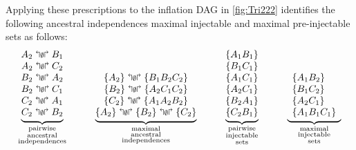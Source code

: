{Applying these prescriptions to the inflation DAG in \cref{fig:Tri222} identifies the following 
 ancestral independences 
maximal injectable and maximal pre-injectable sets as follows:
\begin{align}\label{eq:basicsetup222}
{\underbrace{\begin{matrix}
A_2\aindep B_1\\
A_2\aindep C_2\\
B_2\aindep A_2\\
B_2\aindep C_1\\
C_2\aindep A_1\\
C_2\aindep B_2
\end{matrix}}_{\substack{\text{pairwise}\\\text{ancestral}\\\text{independences}}}}
\qquad\quad
{\underbrace{\begin{matrix}
\\ \\
\brackets{A_2}\aindep \brackets{B_1 B_2 C_2}\\
\brackets{B_2}\aindep \brackets{A_2 C_1 C_2}\\
\brackets{C_2}\aindep \brackets{A_1 A_2 B_2}\\
\brackets{A_2}\aindep \brackets{B_2}\aindep \brackets{C_2}
\end{matrix}}_{\substack{\text{maximal}\\\text{ancestral}\\\text{independences}}}}
\qquad\quad
{\underbrace{\begin{matrix}
\brackets{ A_1 B_1 }\\
\brackets{ B_1 C_1 }\\
\brackets{ A_1 C_1 }\\
\brackets{ A_2 C_1 }\\
\brackets{ B_2 A_1 }\\
\brackets{ C_2 B_1 }\\
\end{matrix}}_{\substack{\text{pairwise}\\\text{injectable}\\\text{sets}}}}
\qquad\quad
{\underbrace{\begin{array}{l}
\\ \\
\brackets{A_1 B_2}\\
\brackets{B_1 C_2}\\
\brackets{A_2 C_1}\\
\brackets{A_1 B_1 C_1}
\end{array}}_{\substack{\text{maximal}\\\text{injectable}\\\text{sets}}}}

\end{align}}
